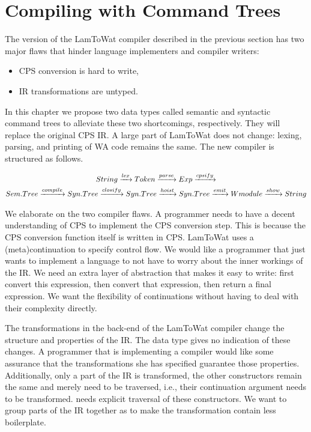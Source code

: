 
\chapter{\label{chap:treecomp}Compiling with Command Trees}
The version of the LamToWat compiler described in the previous section has two major flaws that hinder language implementers and compiler writers:

\begin{itemize}
\item \ac{CPS} conversion is hard to write,
\item \ac{IR} transformations are untyped.
\end{itemize}

In this chapter we propose two data types called semantic and syntactic command trees to alleviate these two shortcomings, respectively. They will replace the original \ac{CPS} \ac{IR}. A large part of LamToWat does not change: lexing, parsing, and printing of \ac{WA} code remains the same. The new compiler is structured as follows.

\begin{gather*}
  String \xrightarrow{lex} Token \xrightarrow{parse} Exp \xrightarrow{cpsify}\\
  Sem.Tree \xrightarrow{compile} Syn.Tree \xrightarrow{closify} Syn.Tree \xrightarrow{hoist} Syn.Tree \xrightarrow{emit} Wmodule \xrightarrow{show} String
\end{gather*}

We elaborate on the two compiler flaws. A programmer needs to have a decent understanding of \ac{CPS} to implement the \ac{CPS} conversion step. This is because the \ac{CPS} conversion function itself is written in \ac{CPS}. LamToWat uses a (meta)continuation to specify control flow. We would like a programmer that just wants to implement a language to not have to worry about the inner workings of the \ac{IR}. We need an extra layer of abstraction that makes it easy to write: first convert this expression, then convert that expression, then return a final expression. We want the flexibility of continuations without having to deal with their complexity directly.

The transformations in the back-end of the LamToWat compiler change the structure and properties of the \ac{IR}. The  data type gives no indication of these changes. A programmer that is implementing a compiler would like some assurance that the transformations she has specified guarantee those properties. Additionally, only a part of the \ac{IR} is transformed, the other constructors remain the same and merely need to be traversed, i.e., their continuation argument needs to be transformed.  needs explicit traversal of these constructors. We want to group parts of the \ac{IR} together as to make the transformation contain less boilerplate.

